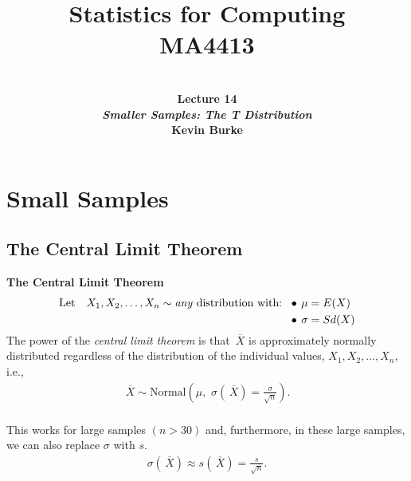 \documentclass[compress]{beamer}        %
\title{{\huge Statistics for Computing\\[0.1cm]MA4413}}
\author[Kevin Burke]{{\bf\\[0.5cm]{\huge Lecture 14}\\[0.2cm]\emph{Smaller Samples: The T Distribution}\\[1.4cm]Kevin Burke}\\[0.3cm]\tcb{kevin.burke@ul.ie}}
\institute[University of Limerick, Maths \& Stats Dept]{}
\date{}
\makeatletter
\newcommand{\tcb}{\textcolor{beamer@blendedblue}}
\makeatother
\begin{document}
\begin{frame}[t]
\titlepage
\end{frame}



\section{Small Samples}
\subsection{The Central Limit Theorem}
\begin{frame}{\bf \tcb{The Central Limit Theorem\\[-1.2cm]}}
\begin{align*}
\text{Let\quad} X_1,X_2,\ldots,X_n \sim \text{\emph{any} distribution with: } &\,\bullet\, \mu = E(X)\\
&\,\bullet\, \sigma = Sd(X)\\[-0.2cm]
\end{align*}

The power of the \emph{central limit theorem} is that $\,\overline{\!X}$ is approximately normally distributed regardless of the distribution of the individual values, $X_1,X_2,\ldots,X_n$, i.e.,
\begin{align*}
\,\overline{\!X} \sim \text{Normal}\left(\mu,\,\,\sigma(\,\overline{\!X}) = \frac{\sigma}{\sqrt{n}}\right).\\[-0.2cm]
\end{align*}

This works for large samples $(n > 30)$ and, furthermore, in these large samples, we can also replace $\sigma$ with $s$.
\begin{align*}
\sigma(\,\overline{\!X}) \approx s(\,\overline{\!X}) = \frac{s}{\sqrt{n}}.
\end{align*}

\end{frame}
\end{document}
